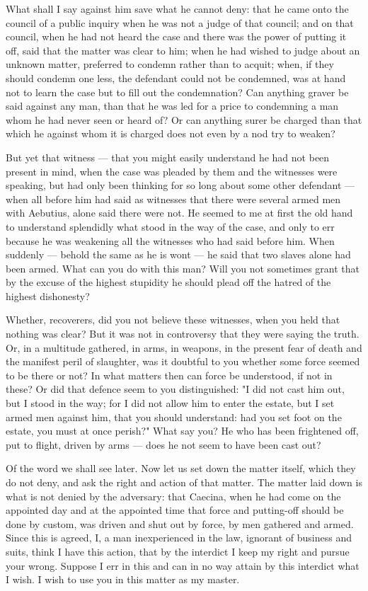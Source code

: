  What shall I say against him save what he cannot deny: that he came onto the council of a public inquiry when he was not a judge of that council; and on that council, when he had not heard the case and there was the power of putting it off, said that the matter was clear to him; when he had wished to judge about an unknown matter, preferred to condemn rather than to acquit; when, if they should condemn one less, the defendant could not be condemned, was at hand not to learn the case but to fill out the condemnation? Can anything graver be said against any man, than that he was led for a price to condemning a man whom he had never seen or heard of? Or can anything surer be charged than that which he against whom it is charged does not even by a nod try to weaken?

 But yet that witness --- that you might easily understand he had not been present in mind, when the case was pleaded by them and the witnesses were speaking, but had only been thinking for so long about some other defendant --- when all before him had said as witnesses that there were several armed men with Aebutius, alone said there were not. He seemed to me at first the old hand to understand splendidly what stood in the way of the case, and only to err because he was weakening all the witnesses who had said before him. When suddenly --- behold the same as he is wont --- he said that two slaves alone had been armed. What can you do with this man? Will you not sometimes grant that by the excuse of the highest stupidity he should plead off the hatred of the highest dishonesty?

 Whether, recoverers, did you not believe these witnesses, when you held that nothing was clear? But it was not in controversy that they were saying the truth. Or, in a multitude gathered, in arms, in weapons, in the present fear of death and the manifest peril of slaughter, was it doubtful to you whether some force seemed to be there or not? In what matters then can force be understood, if not in these? Or did that defence seem to you distinguished: "I did not cast him out, but I stood in the way; for I did not allow him to enter the estate, but I set armed men against him, that you should understand: had you set foot on the estate, you must at once perish?" What say you? He who has been frightened off, put to flight, driven by arms --- does he not seem to have been cast out?

 Of the word we shall see later. Now let us set down the matter itself, which they do not deny, and ask the right and action of that matter. The matter laid down is what is not denied by the adversary: that Caecina, when he had come on the appointed day and at the appointed time that force and putting-off should be done by custom, was driven and shut out by force, by men gathered and armed. Since this is agreed, I, a man inexperienced in the law, ignorant of business and suits, think I have this action, that by the interdict I keep my right and pursue your wrong. Suppose I err in this and can in no way attain by this interdict what I wish. I wish to use you in this matter as my master.

